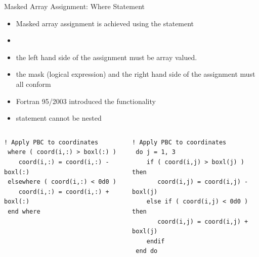 \documentclass[10pt,t]{beamer}
\begin{document}
\begin{frame}[fragile]{Masked Array Assignment: Where Statement}
  \begin{itemize}
    \item Masked array assignment is achieved using the  statement
    \item[] 
    \item[] the left hand side of the assignment must be array valued.
    \item[] the mask (logical expression) and the right hand side of the assignment must all conform
    \item Fortran 95/2003 introduced the  functionality
    \item {} statement cannot be nested
  \end{itemize}
  \begin{columns}[t]
    \column{4.8cm}
    \begin{lstlisting}[language={[90]Fortran},basicstyle=\fontsize{6}{7}\selectfont\ttfamily]
 ! Apply PBC to coordinates
 where ( coord(i,:) > boxl(:) )
    coord(i,:) = coord(i,:) - boxl(:)
 elsewhere ( coord(i,:) < 0d0 )
    coord(i,:) = coord(i,:) + boxl(:)
 end where
    \end{lstlisting}
    \column{5.5cm}
    \begin{lstlisting}[language={[90]Fortran},basicstyle=\fontsize{6}{7}\selectfont\ttfamily]
 ! Apply PBC to coordinates
 do j = 1, 3
    if ( coord(i,j) > boxl(j) ) then
       coord(i,j) = coord(i,j) - boxl(j)
    else if ( coord(i,j) < 0d0 ) then
       coord(i,j) = coord(i,j) + boxl(j)
    endif
 end do
    \end{lstlisting}
  \end{columns}
\end{frame}

\end{document}
